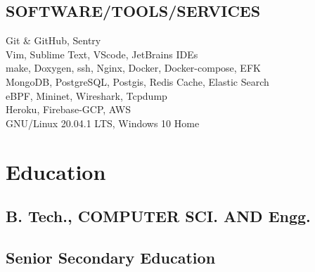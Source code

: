 \documentclass[letterpaper]{deedy-resume} %
\begin{document}
\begin{minipage}[t]{0.33\textwidth}
\subsection{SOFTWARE/TOOLS/SERVICES}
Git \& GitHub, Sentry \\
Vim, Sublime Text, VScode, JetBrains IDEs \\
make, Doxygen, ssh, Nginx, Docker, Docker-compose, EFK \\
MongoDB, PostgreSQL, Postgis, Redis Cache, Elastic Search \\
eBPF, Mininet, Wireshark, Tcpdump \\
Heroku, Firebase-GCP, AWS \\
GNU/Linux 20.04.1 LTS, Windows 10 Home


\sectionspace %


\section{Education} 


\subsection{B. Tech., COMPUTER SCI. AND Engg. }

\sectionspace %

\subsection{Senior Secondary Education}






\end{minipage}
\end{document}
